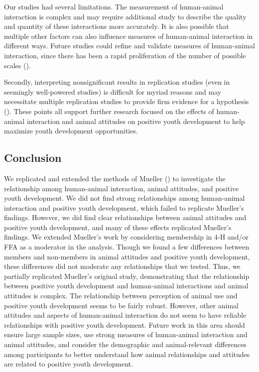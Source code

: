 \documentclass[
  jou,
  longtable,
  nolmodern,
  notxfonts,
  notimes,
  colorlinks=true,linkcolor=blue,citecolor=blue,urlcolor=blue]{apa7}
\begin{document}
Our studies had several limitations. The measurement of human-animal
interaction is complex and may require additional study to describe the
quality and quantity of these interactions more accurately. It is also
possible that multiple other factors can also influence measures of
human-animal interaction in different ways. Future studies could refine
and validate measures of human-animal interaction, since there has been
a rapid proliferation of the number of possible scales
().

Secondly, interpreting nonsignificant results in replication studies
(even in seemingly well-powered studies) is difficult for myriad reasons
and may necessitate multiple replication studies to provide firm
evidence for a hypothesis (). These points all support further research focused on the
effects of human-animal interaction and animal attitudes on positive
youth development to help maximize youth development opportunities.

\subsection{Conclusion}\label{conclusion}

We replicated and extended the methods of Mueller
() to investigate the relationship
among human-animal interaction, animal attitudes, and positive youth
development. We did not find strong relationships among human-animal
interaction and positive youth development, which failed to replicate
Mueller's findings. However, we did find clear relationships between
animal attitudes and positive youth development, and many of these
effects replicated Mueller's findings. We extended Mueller's work by
considering membership in 4-H and/or FFA as a moderator in the analysis.
Though we found a few differences between members and non-members in
animal attitudes and positive youth development, these differences did
not moderate any relationships that we tested. Thus, we partially
replicated Mueller's original study, demonstrating that the relationship
between positive youth development and human-animal interactions and
animal attitudes is complex. The relationship between perception of
animal use and positive youth development seems to be fairly robust.
However, other animal attitudes and aspects of human-animal interaction
do not seem to have reliable relationships with positive youth
development. Future work in this area should ensure large sample sizes,
use strong measures of human-animal interaction and animal attitudes,
and consider the demographic and animal-relevant differences among
participants to better understand how animal relationships and attitudes
are related to positive youth development.
\end{document}
